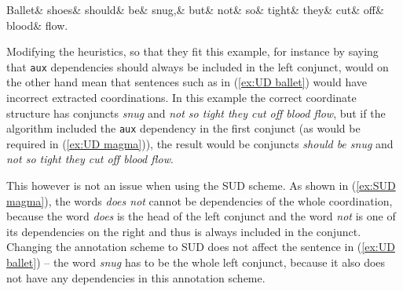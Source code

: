 \begin{adjustwidth}{-20pt}{20pt}
\begin{exe}
\ex\label{ex:UD ballet}
\begin{dependency}[hide label, baseline=-\the\dimexpr\fontdimen22\textfont2\relax]
    \begin{deptext}
        Ballet\& shoes\& should\& be\& snug,\& but\& not\& so\& tight\& they\& cut\& off\& blood\& flow.\footnotemark\\
    \end{deptext}
\end{dependency}
\end{exe}
\end{adjustwidth}

Modifying the heuristics, so that they fit this example, for instance by saying that \texttt{aux} dependencies should always be included in the left conjunct, would on the other hand mean that sentences such as in (\ref{ex:UD ballet}) would have incorrect extracted coordinations. In this example the correct coordinate structure has conjuncts \textsl{snug} and \textsl{not so tight they cut off blood flow}, but if the algorithm included the \texttt{aux} dependency in the first conjunct (as would be required in (\ref{ex:UD magma})), the result would be conjuncts \textsl{should be snug} and \textsl{not so tight they cut off blood flow}.

This however is not an issue when using the SUD scheme. As shown in (\ref{ex:SUD magma}), the words \textsl{does not} cannot be dependencies of the whole coordination, because the word \textsl{does} is the head of the left conjunct and the word \textsl{not} is one of its dependencies on the right and thus is always included in the conjunct. Changing the annotation scheme to SUD does not affect the sentence in (\ref{ex:UD ballet}) -- the word \textsl{snug} has to be the whole left conjunct, because it also does not have any dependencies in this annotation scheme.

